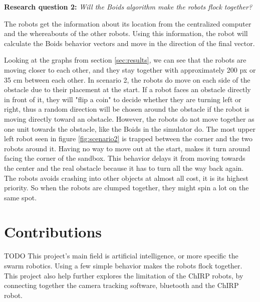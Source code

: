 \textbf{Research question 2:} {\it Will the Boids algorithm make the robots flock together?}

The robots get the information about its location from the centralized computer and the whereabouts of the other robots. Using this information, the robot will calculate the Boids behavior vectors and move in the direction of the final vector.

Looking at the graphs from section \ref{sec:results}, we can see that the robots are moving closer to each other, and they stay together with approximately 200 px or 35 cm between each other. In scenario 2, the robots do move on each side of the obstacle due to their placement at the start. If a robot faces an obstacle directly in front of it, they will "flip a coin" to decide whether they are turning left or right, thus a random direction will be chosen around the obstacle if the robot is moving directly toward an obstacle.
However, the robots do not move together as one unit towards the obstacle, like the Boids in the simulator do. The most upper left robot seen in figure \ref{fig:scenario2} is trapped between the corner and the two robots around it. Having no way to move out at the start, makes it turn around facing the corner of the sandbox. This behavior delays it from moving towards the center and the real obstacle because it has to turn all the way back again.
The robots avoids crashing into other objects at almost all cost, it is its highest priority. So when the robots are clumped together, they might spin a lot on the same spot.



\section{Contributions}
\label{sec:Contributions}
TODO
This project's main field is artificial intelligence, or more specific the swarm robotics. Using a few simple behavior makes the robots flock together.
This project also help further explores the limitation of the ChIRP robots, by connecting together the camera tracking software, bluetooth and the ChIRP robot.

